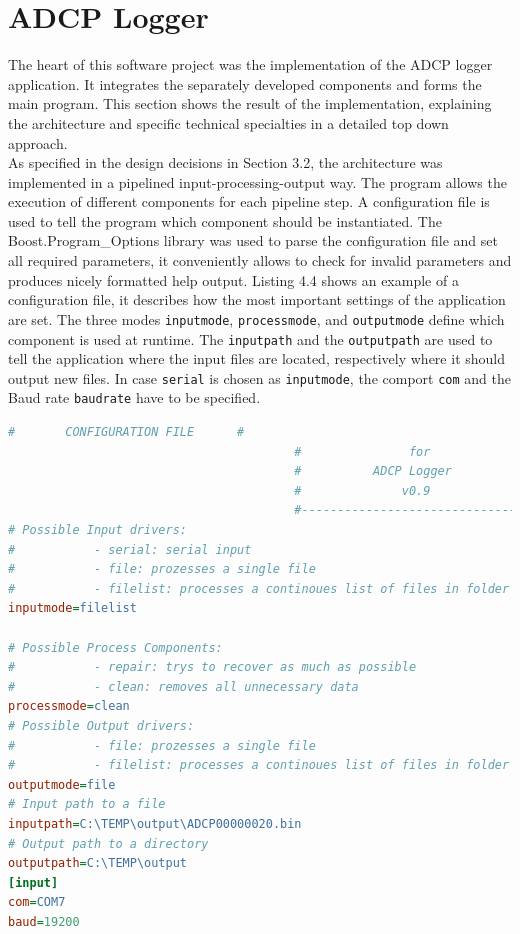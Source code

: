 \section{ADCP Logger}
The heart of this software project was the implementation of the ADCP logger application. It integrates the separately developed components and forms the main program. This section shows the result of the implementation, explaining the architecture and specific technical specialties in a detailed top down approach.\\
As specified in the design decisions in Section 3.2, the architecture was implemented in a pipelined input-processing-output way. The program allows the execution of different components for each pipeline step. A configuration file is used to tell the program which component should be instantiated. The Boost.Program\_Options library was used to parse the configuration file and set all required parameters, it conveniently allows to check for invalid parameters and produces nicely formatted help output. Listing 4.4 shows an example of a configuration file, it describes how the most important settings of the application are set. The three modes \texttt{inputmode}, \texttt{processmode}, and \texttt{outputmode} define which component is used at runtime. The \texttt{inputpath} and the \texttt{outputpath} are used to tell the application where the input files are located, respectively where it should output new files. In case \texttt{serial} is chosen as \texttt{inputmode}, the comport \texttt{com} and the Baud rate \texttt{baudrate} have to be specified. 
\vspace{1em}
\begin{lstlisting}[language={Ini}, caption=A Snippet of a configuration file for the ADCP logger application.]
                                        #       CONFIGURATION FILE      #
                                        #               for             #
                                        #          ADCP Logger          #
                                        #              v0.9             #
                                        #-------------------------------#
# Possible Input drivers:
#           - serial: serial input
#           - file: prozesses a single file
#           - filelist: processes a continoues list of files in folder
inputmode=filelist

# Possible Process Components:
#           - repair: trys to recover as much as possible
#           - clean: removes all unnecessary data
processmode=clean
# Possible Output drivers:
#           - file: prozesses a single file
#           - filelist: processes a continoues list of files in folder
outputmode=file
# Input path to a file
inputpath=C:\TEMP\output\ADCP00000020.bin
# Output path to a directory
outputpath=C:\TEMP\output
[input]
com=COM7
baud=19200
\end{lstlisting}
